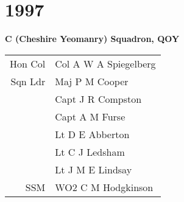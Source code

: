 \chapter*{1997}

\vspace*{10mm}

\begin{center}
  \Large
  \textbf{C (Cheshire Yeomanry) Squadron, QOY}
\end{center}

\begin{center}
  \small
  \begin{tabular}{rl}
    Hon Col & Col A W A Spiegelberg \\
    Sqn Ldr & Maj P M Cooper \\
    & Capt J R Compston \\
    & Capt A M Furse \\
    & Lt D E Abberton \\
    & Lt C J Ledsham \\
    & Lt J M E Lindsay \\
    SSM & WO2 C M Hodgkinson \\
  \end{tabular}
\end{center}

